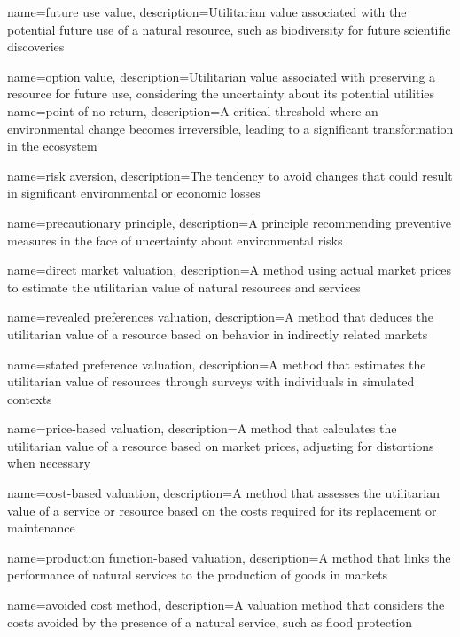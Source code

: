 {
	name=future use value,
	description={Utilitarian value associated with the potential future use of a natural resource, such as biodiversity for future scientific discoveries}
}

{
	name=option value,
	description={Utilitarian value associated with preserving a resource for future use, considering the uncertainty about its potential utilities}
}
{
	name=point of no return,
	description={A critical threshold where an environmental change becomes irreversible, leading to a significant transformation in the ecosystem}
}

{
	name=risk aversion,
	description={The tendency to avoid changes that could result in significant environmental or economic losses}
}

{
	name=precautionary principle,
	description={A principle recommending preventive measures in the face of uncertainty about environmental risks}
}

{
	name=direct market valuation,
	description={A method using actual market prices to estimate the utilitarian value of natural resources and services}
}

{
	name=revealed preferences valuation,
	description={A method that deduces the utilitarian value of a resource based on behavior in indirectly related markets}
}

{
	name=stated preference valuation,
	description={A method that estimates the utilitarian value of resources through surveys with individuals in simulated contexts}
}

{
	name=price-based valuation,
	description={A method that calculates the utilitarian value of a resource based on market prices, adjusting for distortions when necessary}
}

{
	name=cost-based valuation,
	description={A method that assesses the utilitarian value of a service or resource based on the costs required for its replacement or maintenance}
}

{
	name=production function-based valuation,
	description={A method that links the performance of natural services to the production of goods in markets}
}

{
	name=avoided cost method,
	description={A valuation method that considers the costs avoided by the presence of a natural service, such as flood protection}
}

